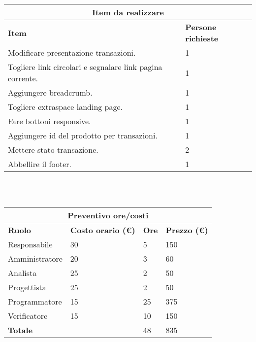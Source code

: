 \documentclass[a4paper, 12pt]{article}
\begin{document}
\begin{center}
    \begin{tabularx}{\textwidth}{|X|X|}
        \hline
        \multicolumn{2}{|c|}{\textbf{Item da realizzare}}\\
        \hline
        \hline
        \textbf{Item} & \textbf{Persone richieste}\\
        \hline
        Modificare presentazione transazioni. & 1\\
		\hline
        Togliere link circolari e segnalare link pagina corrente. & 1\\
		\hline
        Aggiungere breadcrumb. & 1\\
		\hline
        Togliere extraspace landing page. & 1\\
		\hline
        Fare bottoni responsive. & 1\\
		\hline
        Aggiungere id del prodotto per transazioni. & 1\\
		\hline
        Mettere stato transazione. & 2\\
		\hline
        Abbellire il footer. & 1\\
		\hline
    \end{tabularx}\\[8pt]
    \mbox{}\\
\end{center}

\begin{center}
    \begin{tabularx}{\textwidth}{|X|X|X|X|}
        \hline
        \multicolumn{4}{|c|}{\textbf{Preventivo ore/costi}}\\
        \hline
        \hline
        \textbf{Ruolo} & \textbf{Costo orario (\euro)} & \textbf{Ore} & \textbf{Prezzo (\euro)}\\
        \hline
        Responsabile    & 30 & 5  & 150\\
        \hline
        Amministratore  & 20 & 3  & 60\\
        \hline
        Analista        & 25 & 2  & 50\\
        \hline
        Progettista     & 25 & 2  & 50\\
        \hline
        Programmatore   & 15 & 25  & 375\\
        \hline
        Verificatore    & 15 & 10  & 150\\
        \hline
        \hline
        \textbf{Totale} &    & 48 & 835\\
        \hline
    \end{tabularx}\\[8pt]
    \mbox{}\\
\end{center}
\end{document}
